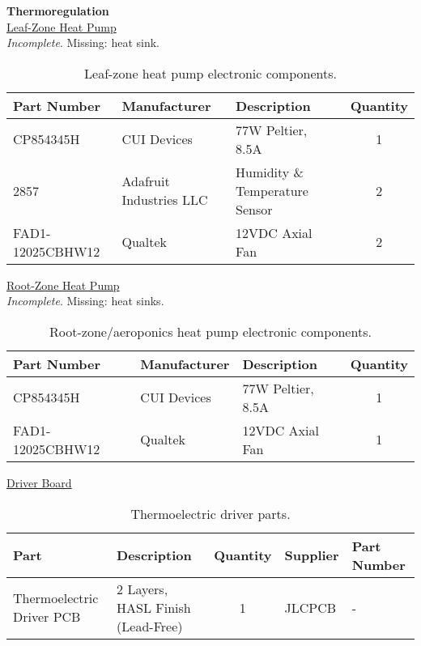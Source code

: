 \clearpage

\textbf{Thermoregulation}\\
\uline{Leaf-Zone Heat Pump}\\
\textit{Incomplete}. Missing: heat sink.
\begin{table}[!ht]
    \centering
    \begin{tabular}{|l|l|l|c|}
    \hline
        Part Number         & Manufacturer              & Description                       & Quantity  \\ \hline
        CP854345H           & CUI Devices               & 77W Peltier, 8.5A                 & 1         \\ \hline
        2857                & Adafruit Industries LLC   & Humidity \& Temperature Sensor    & 2         \\ \hline
        FAD1-12025CBHW12    & Qualtek                   & 12VDC Axial Fan                   & 2         \\ \hline
    \end{tabular}
    \caption{Leaf-zone heat pump electronic components.}
    \label{tab:thermoregulation_leafzone_components}
\end{table}

\uline{Root-Zone Heat Pump}\\
\textit{Incomplete}. Missing: heat sinks.
\begin{table}[!ht]
    \centering
    \begin{tabular}{|l|l|l|c|}
    \hline
        Part Number         & Manufacturer              & Description                       & Quantity  \\ \hline
        CP854345H           & CUI Devices               & 77W Peltier, 8.5A                 & 1         \\ \hline
        FAD1-12025CBHW12    & Qualtek                   & 12VDC Axial Fan                   & 1         \\ \hline
    \end{tabular}
    \caption{Root-zone/aeroponics heat pump electronic components.}
    \label{tab:thermoregulation_rootzone_components}
\end{table}

\clearpage

\uline{Driver Board}
\begin{table}[!ht]
    \centering
    \begin{tabular}{|l|l|c|l|l|}
    \hline
        Part                        & Description                       & Quantity  & Supplier  & Part Number  \\ \hline
        Thermoelectric Driver PCB   & 2 Layers, HASL Finish (Lead-Free) & 1         & JLCPCB    & -                     \\ \hline
    \end{tabular}
    \caption{Thermoelectric driver parts.}
    \label{tab:automation_parts}
\end{table}

